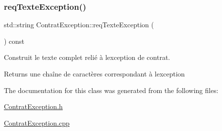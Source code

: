 \subsubsection{\texorpdfstring{req\+Texte\+Exception()}{reqTexteException()}}
{\footnotesize\ttfamily std\+::string Contrat\+Exception\+::req\+Texte\+Exception (\begin{DoxyParamCaption}{ }\end{DoxyParamCaption}) const}



Construit le texte complet relié à l\textquotesingle{}exception de contrat. 

\begin{DoxyReturn}{Returns}
une chaîne de caractères correspondant à l\textquotesingle{}exception 
\end{DoxyReturn}


The documentation for this class was generated from the following files\+:\begin{DoxyCompactItemize}
\item 
\hyperlink{ContratException_8h}{Contrat\+Exception.\+h}\item 
\hyperlink{ContratException_8cpp}{Contrat\+Exception.\+cpp}\end{DoxyCompactItemize}
